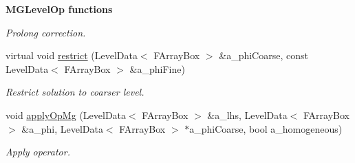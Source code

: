 \begin{Indent}{\bf M\-G\-Level\-Op functions}
\begin{DoxyCompactItemize}
\begin{DoxyCompactList}\small\item\em Prolong correction. \end{DoxyCompactList}\item 
\hypertarget{class_a_m_r_non_linear_v_c_op_addbabef7e850c8df43dcf5087a94619d}{virtual void \hyperlink{class_a_m_r_non_linear_v_c_op_addbabef7e850c8df43dcf5087a94619d}{restrict} (Level\-Data$<$ F\-Array\-Box $>$ \&a\-\_\-phi\-Coarse, const Level\-Data$<$ F\-Array\-Box $>$ \&a\-\_\-phi\-Fine)}\label{class_a_m_r_non_linear_v_c_op_addbabef7e850c8df43dcf5087a94619d}

\begin{DoxyCompactList}\small\item\em Restrict solution to coarser level. \end{DoxyCompactList}\item 
\hypertarget{class_a_m_r_non_linear_v_c_op_a0c3e7099442fbf2672ec0ccfe21c3837}{void \hyperlink{class_a_m_r_non_linear_v_c_op_a0c3e7099442fbf2672ec0ccfe21c3837}{apply\-Op\-Mg} (Level\-Data$<$ F\-Array\-Box $>$ \&a\-\_\-lhs, Level\-Data$<$ F\-Array\-Box $>$ \&a\-\_\-phi, Level\-Data$<$ F\-Array\-Box $>$ $\ast$a\-\_\-phi\-Coarse, bool a\-\_\-homogeneous)}\label{class_a_m_r_non_linear_v_c_op_a0c3e7099442fbf2672ec0ccfe21c3837}

\begin{DoxyCompactList}\small\item\em Apply operator. \end{DoxyCompactList}\end{DoxyCompactItemize}
\end{Indent}
